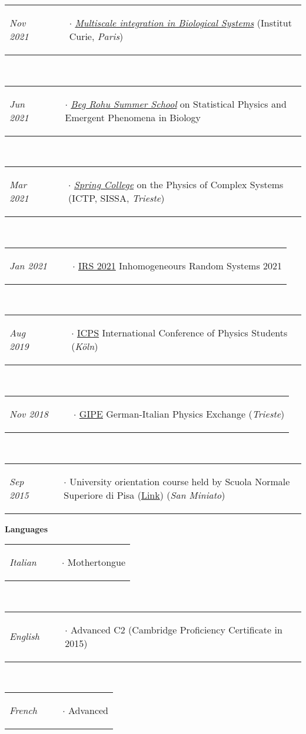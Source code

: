 \documentclass{scrartcl}
\newcommand{\NewItemEntry}[2]{
  \noindent
  \begin{tabular}[r]{p{2.5cm} p{14.0cm}}
    \-\hspace{0.5cm} \small \textit{#1}
    &
    \begin{itemize}
      \vspace{-0.65cm}
      \item[$\cdot$] #2
    \end{itemize}
  \end{tabular}
  \vspace{-0.2cm}
}
\begin{document}
\begin{cv}{}
{\NewItemEntry{Nov 2021}{\textit{\href{https://training.institut-curie.org/courses/multiscale-integration-in-biological-systems-3}{Multiscale integration in Biological Systems}} (Institut Curie, \textit{Paris})}\\
\NewItemEntry{Jun 2021}{\textit{\href{https://www.ipht.fr/Meetings/BegRohu2021/index.html}{Beg Rohu Summer School}} on Statistical Physics and Emergent Phenomena in Biology} \\
\NewItemEntry{Mar 2021}{\textit{\href{http://indico.ictp.it/event/9442/}{Spring College}} on the Physics of Complex Systems (ICTP, SISSA, \textit{Trieste})}\\
\NewItemEntry{Jan 2021}{\href{http://irs.math.cnrs.fr/2021/}{IRS 2021} Inhomogeneours Random Systems 2021}\\
\NewItemEntry{Aug 2019}{\href{https://www.iaps.info/icps/previous-icpss/icps-2019-in-germany/}{ICPS} International Conference of Physics Students (\textit{Köln})}\\
\NewItemEntry{Nov 2018}{\href{http://ai-sf.it/gipe18/}{GIPE} German-Italian Physics Exchange (\textit{Trieste})}\\
\NewItemEntry{Sep 2015}{University orientation course held by Scuola Normale Superiore di Pisa (\href{https://www.sns.it/it/orientamento}{Link}) (\textit{San Miniato})}

\vspace{1em}


\normalsize

\textcolor{carmine}{\textbf{Languages}}
\vspace{1em}

\small
\NewItemEntry{Italian}{Mothertongue}\\[\v]
\NewItemEntry{English}{Advanced C2 (Cambridge Proficiency Certificate in 2015)}\\[\v]
\NewItemEntry{French}{Advanced}\\[\v]

}\fi
\date{}
\end{cv}
\end{document}
